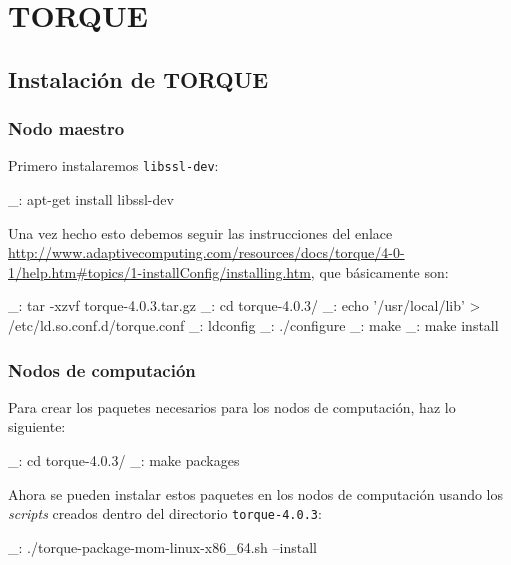 \chapter{TORQUE}
\label{anx:torque}

\section{Instalación de TORQUE}


\subsection{Nodo maestro}

Primero instalaremos \texttt{libssl-dev}:

\begin{bashcode}
_: apt-get install libssl-dev
\end{bashcode}

Una vez hecho esto debemos seguir las instrucciones del enlace \url{http://www.adaptivecomputing.com/resources/docs/torque/4-0-1/help.htm#topics/1-installConfig/installing.htm}, que básicamente son:

\begin{bashcode}
_: tar -xzvf torque-4.0.3.tar.gz
_: cd torque-4.0.3/
_: echo '/usr/local/lib' > /etc/ld.so.conf.d/torque.conf
_: ldconfig
_: ./configure
_: make
_: make install
\end{bashcode}


\subsection{Nodos de computación}

Para crear los paquetes necesarios para los nodos de computación, haz lo siguiente:

\begin{bashcode}
_: cd torque-4.0.3/
_: make packages
\end{bashcode}

Ahora se pueden instalar estos paquetes en los nodos de computación usando los \emph{scripts} creados dentro del directorio \texttt{torque-4.0.3}:

\begin{bashcode}
_: ./torque-package-mom-linux-x86_64.sh --install
\end{bashcode}


